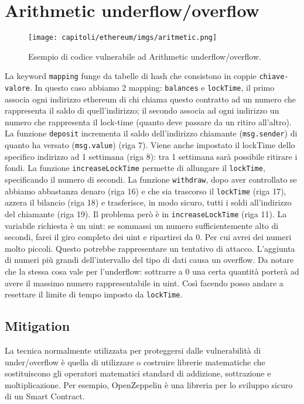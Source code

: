 \section{Arithmetic underflow/overflow}

\begin{figure}[H]
      \centering
      \texttt{[image: capitoli/ethereum/imgs/aritmetic.png]}
      \caption{Esempio di codice vulnerabile ad Arithmetic underflow/overflow.}
\end{figure}

La keyword \verb|mapping| funge da tabelle di hash che consistono in coppie \verb|chiave-valore|. In questo caso abbiamo 2 mapping: \verb|balances| e \verb|lockTime|, il primo associa ogni indirizzo ethereum di chi chiama questo contratto ad un numero
che rappresenta il saldo di quell'indirizzo; il secondo associa ad ogni indirizzo un numero che rappresenta il lock-time (quanto deve passare da un ritiro all'altro).
La funzione \verb|deposit| incrementa il saldo dell'indirizzo chiamante (\verb|msg.sender|) di quanto ha versato (\verb|msg.value|) (riga 7). Viene anche impostato il lockTime dello specifico indirizzo ad 1 settimana (riga 8): tra 1 settimana sarà possibile ritirare i fondi.
La funzione \verb|increaseLockTime| permette di allungare il \verb|lockTime|, specificando
il numero di secondi.
La funzione \verb|withdraw|, dopo aver controllato se abbiamo abbastanza denaro
(riga 16) e che sia trascorso il \verb|lockTime| (riga 17), azzera
il bilancio (riga 18)
e trasferisce, in modo sicuro, tutti i soldi all'indirizzo del chiamante (riga 19).
Il problema però è in \verb|increaseLockTime| (riga 11).
La variabile richiesta è un uint: se sommassi un
numero sufficientemente alto di secondi, farei il giro completo dei uint e
ripartirei da 0.
Per cui avrei dei numeri molto piccoli.
Questo potrebbe rappresentare un tentativo di attacco.
L'aggiunta di numeri più grandi dell'intervallo del tipo di dati causa un overflow.
Da notare che la stessa cosa vale per l'underflow: sottrarre a $0$ una certa
quantità porterà ad avere il massimo numero rappresentabile in uint.
Così facendo posso andare a resettare il limite di tempo imposto da \verb|lockTime|.

\subsection{Mitigation}

La tecnica normalmente utilizzata per proteggersi dalle vulnerabilità di
under/overflow è
quella di utilizzare o costruire librerie matematiche che sostituiscono gli
operatori matematici
standard di addizione, sottrazione e moltiplicazione.
Per esempio, OpenZeppelin è una
libreria per lo sviluppo sicuro di un Smart Contract.

